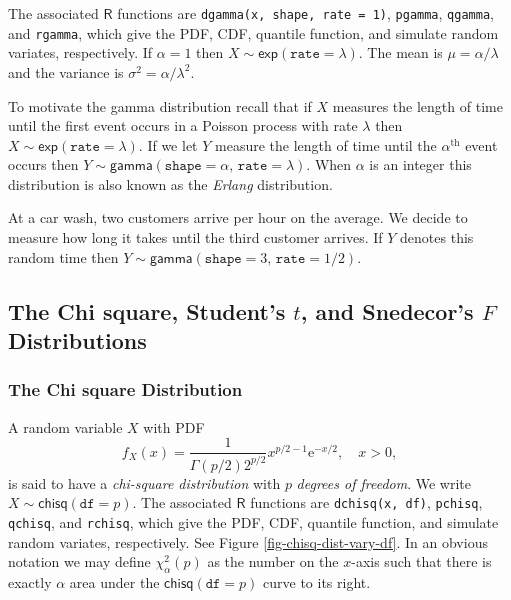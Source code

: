 \documentclass[captions=tableheading]{scrbook}
\begin{document}
The associated \(\mathsf{R}\) functions are \texttt{dgamma(x, shape, rate = 1)}, \texttt{pgamma}, \texttt{qgamma}, and \texttt{rgamma}, which give the PDF, CDF, quantile function, and simulate random variates, respectively. If \(\alpha=1\) then \(X\sim\mathsf{exp}(\mathtt{rate}=\lambda)\). The mean is \(\mu=\alpha/\lambda\) and the variance is \(\sigma^{2}=\alpha/\lambda^{2}\).

To motivate the gamma distribution recall that if \(X\) measures the length of time until the first event occurs in a Poisson process with rate \(\lambda\) then \(X\sim\mathsf{exp}(\mathtt{rate}=\lambda)\). If we let \(Y\) measure the length of time until the \(\alpha^{\mathrm{th}}\) event occurs then \(Y\sim\mathsf{gamma}(\mathtt{shape}=\alpha,\,\mathtt{rate}=\lambda)\). When \(\alpha\) is an integer this distribution is also known as the \emph{Erlang} distribution.

\begin{example}
At a car wash, two customers arrive per hour on the average. We decide to measure how long it takes until the third customer arrives. If \(Y\) denotes this random time then \(Y\sim\mathsf{gamma}(\mathtt{shape}=3,\,\mathtt{rate}=1/2)\).
\end{example}
\subsection{The Chi square, Student's \(t\), and Snedecor's \(F\) Distributions}
\label{sec-6-5-2}
\label{sub-The-Chi-Square-t-F}
\subsubsection{The Chi square Distribution}
\label{sec-6-5-2-1}
\label{sub-The-Chi-Square}


A random variable \(X\) with PDF
\begin{equation}
f_{X}(x)=\frac{1}{\Gamma(p/2)2^{p/2}}x^{p/2-1}\mathrm{e}^{-x/2},\quad x>0,
\end{equation}
is said to have a \emph{chi-square distribution} with \(p\) \emph{degrees of freedom}. We write \(X\sim\mathsf{chisq}(\mathtt{df}=p)\). The associated \(\mathsf{R}\) functions are \texttt{dchisq(x, df)}, \texttt{pchisq}, \texttt{qchisq}, and \texttt{rchisq}, which give the PDF, CDF, quantile function, and simulate random variates, respectively. See Figure \ref{fig-chisq-dist-vary-df}. In an obvious notation we may define \(\chi_{\alpha}^{2}(p)\) as the number on the \(x\)-axis such that there is exactly \(\alpha\) area under the \(\mathsf{chisq}(\mathtt{df}=p)\) curve to its right.
\end{document}
